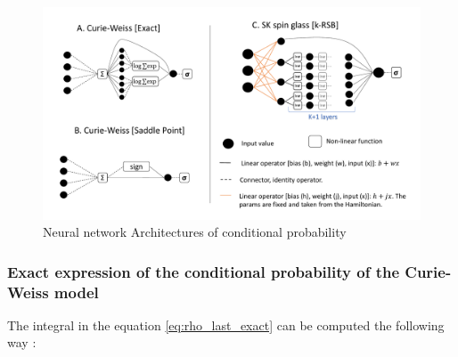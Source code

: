 \documentclass{article}
\begin{document}
 \begin{figure}[!h]
    \centering 
    \includegraphics[width=1\textwidth]{img/nn_img.pdf}
    \caption{Neural network Architectures of conditional probability}
    \label{fig:curie_weiss}
\end{figure}


 \subsubsection{Exact expression of the conditional probability of the Curie-Weiss model}
 The integral in the equation \ref{eq:rho_last_exact} can be computed the following way :
\end{document}
